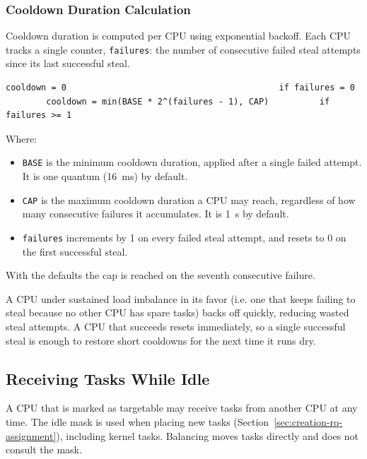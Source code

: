 \documentclass[11pt]{article}
\newcounter{formulacounter}
\newenvironment{specformula}[1]{%
    \refstepcounter{formulacounter}%
    \begin{tcolorbox}[colback=blue!3, colframe=black!60, boxrule=0.4pt,
        left=6pt, right=6pt, top=4pt, bottom=4pt,
        fonttitle=\bfseries, title={Formula~\theformulacounter: #1}, breakable]
}{%
    \end{tcolorbox}%
}
\begin{document}
\subsubsection{Cooldown Duration Calculation}
\label{sec:cooldown-duration}

Cooldown duration is computed per CPU using exponential backoff.
Each CPU tracks a single counter, \texttt{failures}: the number of consecutive failed steal attempts since its last successful steal.

\begin{specformula}{Cooldown Duration}
	\label{eq:cooldown}
	\begin{Verbatim}[fontsize=\small]
		cooldown = 0                                          if failures = 0
		cooldown = min(BASE * 2^(failures - 1), CAP)          if failures >= 1
	\end{Verbatim}
\end{specformula}

Where:

\begin{itemize}
	\item \texttt{BASE} is the minimum cooldown duration, applied after a single failed attempt. It is one quantum (16~ms) by default.
	\item \texttt{CAP} is the maximum cooldown duration a CPU may reach, regardless of how many consecutive failures it accumulates. It is 1~s by default.
	\item \texttt{failures} increments by 1 on every failed steal attempt, and resets to 0 on the first successful steal.
\end{itemize}

With the defaults the cap is reached on the seventh consecutive failure.

A CPU under sustained load imbalance in its favor (i.e. one that keeps failing to steal because no other CPU has spare tasks) backs off quickly, reducing wasted steal attempts.
A CPU that succeeds resets immediately, so a single successful steal is enough to restore short cooldowns for the next time it runs dry.

\subsection{Receiving Tasks While Idle}
\label{sec:idle-receiving}

A CPU that is marked as targetable may receive tasks from another CPU at any time.
The idle mask is used when placing new tasks (Section~\ref{sec:creation-rq-assignment}), including kernel tasks.
Balancing moves tasks directly and does not consult the mask.
\end{document}
